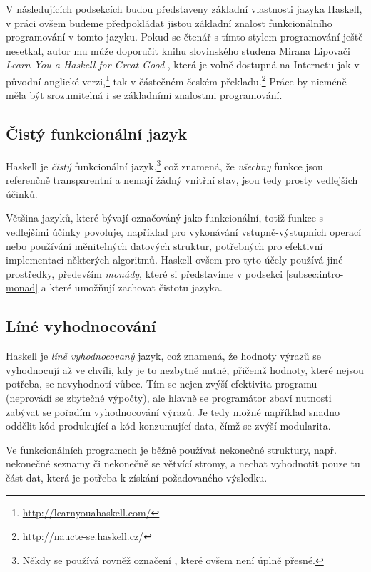 V následujících podsekcích budou představeny základní vlastnosti jazyka Haskell,
v práci ovšem budeme předpokládat jistou základní znalost funkcionálního
programování v tomto jazyku. Pokud se čtenář s tímto stylem programování ještě
nesetkal, autor mu může doporučit knihu slovinského studena Mirana Lipovači
\emph{Learn You a Haskell for Great Good} \cite{lipovaca2011learn}, která je
volně dostupná na Internetu jak v původní anglické
verzi,\footnote{\url{http://learnyouahaskell.com/}} tak v částečném českém
překladu.\footnote{\url{http://naucte-se.haskell.cz/}} Práce by nicméně měla být
srozumitelná i se základními znalostmi  programování.

\subsection{Čistý funkcionální jazyk}

Haskell je \emph{čistý} funkcionální jazyk,\footnote{Někdy se používá rovněž
označení , které ovšem není úplně přesné.} což
znamená, že \emph{všechny} funkce jsou referenčně transparentní a nemají žádný
vnitřní stav, jsou tedy prosty vedlejších účinků.  

Většina jazyků, které bývají označováný jako funkcionální, totiž funkce s
vedlejšími účinky povoluje, například pro vykonávání vstupně-výstupních operací
nebo používání měnitelných datových struktur, potřebných pro efektivní
implementaci některých algoritmů. Haskell ovšem pro tyto účely používá jiné
prostředky, především \emph{monády}, které si představíme v podsekci
\ref{subsec:intro-monad} a které umožňují zachovat čistotu jazyka.

\subsection{Líné vyhodnocování}

Haskell je \emph{líně vyhodnocovaný} jazyk, což znamená, že hodnoty výrazů se
vyhodnocují až ve chvíli, kdy je to nezbytně nutné, přičemž hodnoty, které
nejsou potřeba, se nevyhodnotí vůbec. Tím se nejen zvýší efektivita programu
(neprovádí se zbytečné výpočty), ale hlavně se programátor zbaví nutnosti
zabývat se pořadím vyhodnocování výrazů. Je tedy možné například snadno oddělit
kód produkující a kód konzumující data, čímž se zvýší modularita.
\cite{hughes1989functional}

Ve funkcionálních programech je běžné používat nekonečné struktury, např.
nekonečné seznamy či nekonečně se větvící stromy, a nechat vyhodnotit pouze tu
část dat, která je potřeba k získání požadovaného výsledku.

